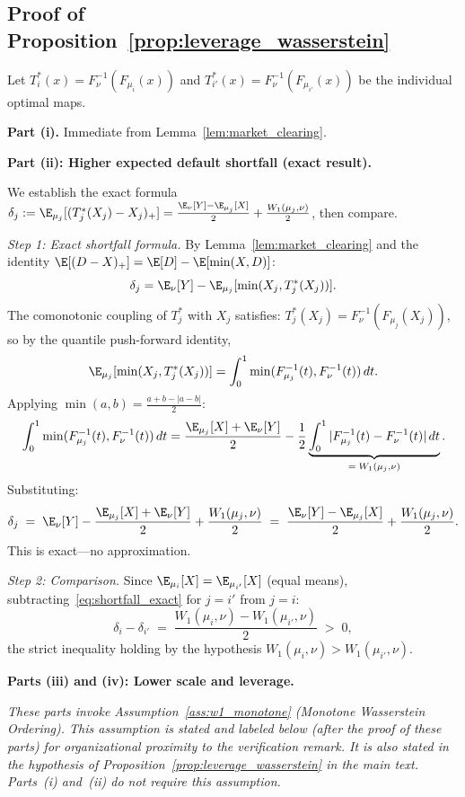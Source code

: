 \subsection*{Proof of Proposition~\ref{prop:leverage_wasserstein}}

Let $T_i^*(x) = F_\nu^{-1}(F_{\mu_i}(x))$ and $T_{i'}^*(x) = F_\nu^{-1}(F_{\mu_{i'}}(x))$ be the individual optimal maps.

\textbf{Part (i).} Immediate from Lemma~\ref{lem:market_clearing}.

\textbf{Part (ii): Higher expected default shortfall (exact result).}

We establish the exact formula $\delta_j := \E_{\mu_j}[(T_j^*(X_j)-X_j)_+] = \frac{\E_\nu[Y]-\E_{\mu_j}[X]}{2} + \frac{W_1(\mu_j,\nu)}{2}$, then compare.

\emph{Step 1: Exact shortfall formula.}
By Lemma~\ref{lem:market_clearing} and the identity $\E[(D-X)_+] = \E[D] - \E[\min(X,D)]$:
\[
  \delta_j = \E_\nu[Y] - \E_{\mu_j}[\min(X_j,T_j^*(X_j))].
\]
The comonotonic coupling of $T_j^*$ with $X_j$ satisfies: $T_j^*(X_j) = F_\nu^{-1}(F_{\mu_j}(X_j))$, so by the quantile push-forward identity,
\[
  \E_{\mu_j}[\min(X_j,T_j^*(X_j))] = \int_0^1 \min(F_{\mu_j}^{-1}(t), F_\nu^{-1}(t))\,dt.
\]
Applying $\min(a,b) = \frac{a+b-|a-b|}{2}$:
\[
  \int_0^1 \min(F_{\mu_j}^{-1}(t), F_\nu^{-1}(t))\,dt = \frac{\E_{\mu_j}[X]+\E_\nu[Y]}{2} - \frac{1}{2}\underbrace{\int_0^1 |F_{\mu_j}^{-1}(t)-F_\nu^{-1}(t)|\,dt}_{=\;W_1(\mu_j,\nu)}.
\]
Substituting:
\begin{equation*}
  \delta_j \;=\; \E_\nu[Y] - \frac{\E_{\mu_j}[X]+\E_\nu[Y]}{2} + \frac{W_1(\mu_j,\nu)}{2} \;=\; \frac{\E_\nu[Y]-\E_{\mu_j}[X]}{2} + \frac{W_1(\mu_j,\nu)}{2}.
\end{equation*}
This is exact—no approximation.

\emph{Step 2: Comparison.}
Since $\E_{\mu_i}[X] = \E_{\mu_{i'}}[X]$ (equal means), subtracting~\eqref{eq:shortfall_exact} for $j=i'$ from $j=i$:
\[
  \delta_i - \delta_{i'} \;=\; \frac{W_1(\mu_i,\nu) - W_1(\mu_{i'},\nu)}{2} \;>\; 0,
\]
the strict inequality holding by the hypothesis $W_1(\mu_i,\nu) > W_1(\mu_{i'},\nu)$.

\textbf{Parts (iii) and (iv): Lower scale and leverage.}

\emph{These parts invoke Assumption~\ref{ass:w1_monotone} (Monotone Wasserstein Ordering). This assumption is stated and labeled below (after the proof of these parts) for organizational proximity to the verification remark. It is also stated in the hypothesis of Proposition~\ref{prop:leverage_wasserstein} in the main text. Parts~(i) and~(ii) do not require this assumption.}


